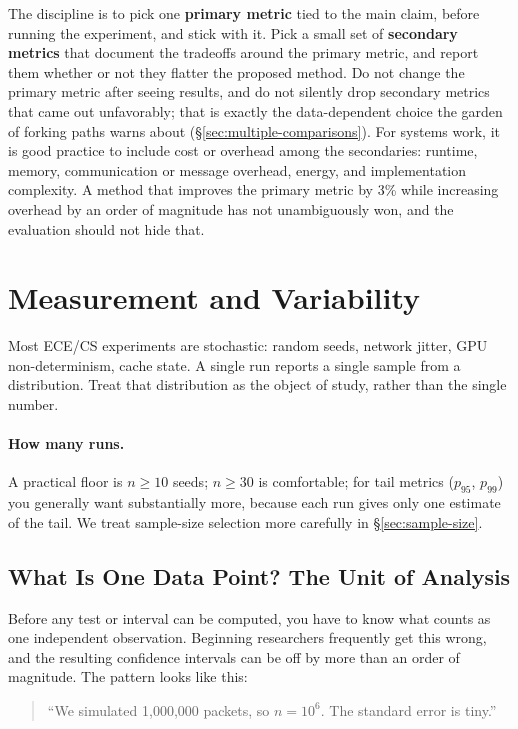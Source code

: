\documentclass[11pt]{article}
\begin{document}
The discipline is to pick one \textbf{primary metric} tied to the main claim, before running the experiment, and stick with it. Pick a small set of \textbf{secondary metrics} that document the tradeoffs around the primary metric, and report them whether or not they flatter the proposed method. Do not change the primary metric after seeing results, and do not silently drop secondary metrics that came out unfavorably; that is exactly the data-dependent choice the garden of forking paths warns about (\S\ref{sec:multiple-comparisons}). For systems work, it is good practice to include cost or overhead among the secondaries: runtime, memory, communication or message overhead, energy, and implementation complexity. A method that improves the primary metric by 3\% while increasing overhead by an order of magnitude has not unambiguously won, and the evaluation should not hide that.

\section{Measurement and Variability}
\label{sec:variability}

Most ECE/CS experiments are stochastic: random seeds, network jitter, GPU non-determinism, cache state. A single run reports a single sample from a distribution. Treat that distribution as the object of study, rather than the single number.

\paragraph{How many runs.} A practical floor is $n \geq 10$ seeds; $n \geq 30$ is comfortable; for tail metrics ($p_{95}$, $p_{99}$) you generally want substantially more, because each run gives only one estimate of the tail. We treat sample-size selection more carefully in \S\ref{sec:sample-size}.

\subsection{What Is One Data Point? The Unit of Analysis}
\label{sec:unit-of-analysis}

Before any test or interval can be computed, you have to know what counts as one independent observation. Beginning researchers frequently get this wrong, and the resulting confidence intervals can be off by more than an order of magnitude. The pattern looks like this:

\begin{quote}
``We simulated 1{,}000{,}000 packets, so $n = 10^6$. The standard error is tiny.''
\end{quote}
\end{document}
